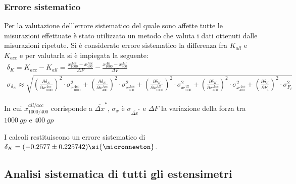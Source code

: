 \documentclass[a4paper,11pt,oneside]{article}
\begin{document}
\subsubsection{Errore sistematico}
Per la valutazione dell'errore sistematico del quale sono affette tutte le misurazioni effettuate è stato utilizzato un metodo che valuta i dati ottenuti dalle misurazioni ripetute. Si è considerato errore sistematico la differenza fra $K_{all}$ e $K_{acc}$ e per valutarla si è impiegata la seguente:
\begin{gather*}%
    
    \delta_{K} = K_{acc}- K_{all}=\frac{x^{Acc}_{1000}-x^{Acc}_{400}}{\Delta F}-\frac{x^{All}_{1000}-x^{All}_{400}}{\Delta F} \\

    \sigma_{\delta_K}\approx \sqrt{
\left ( \frac{\partial \delta_K }{\partial x^{Acc}_{1000}} \right )^2\cdot  \sigma_{x^{Acc}_{1000}} ^2+
\left ( \frac{\partial \delta_K}{\partial x^{Acc}_{400}} \right )^2\cdot  \sigma_{x^{Acc}_{400}} ^2+
\left ( \frac{\partial \delta_K }{\partial x^{All}_{1000}} \right )^2\cdot  \sigma_{x^{All}_{1000}} ^2+
\left ( \frac{\partial \delta_K }{\partial x^{Acc}_{400}} \right )^2\cdot  \sigma_{x^{Acc}_{400}} ^2+
\left ( \frac{\partial \delta_K}{\partial F_i} \right )^2\cdot  \sigma_{F_i} ^2}
\end{gather*}

In cui $x_{1000 / 400}^{all / acc}$ corrisponde a $\overline{\Delta x}^\ast$, $\sigma_{x}$ è $\sigma_{\overline{\Delta x}^\ast}$ e $\Delta F$ la variazione della forza tra $\SI{1000}{gp}$ e $\SI{400}{gp}$

I calcoli restituiscono un errore sistematico di $\delta_{K} = (-0.2577 \pm 0.225742) \si{\micronnewton}$. 





\subsection{Analisi sistematica di tutti gli estensimetri}
\end{document}

